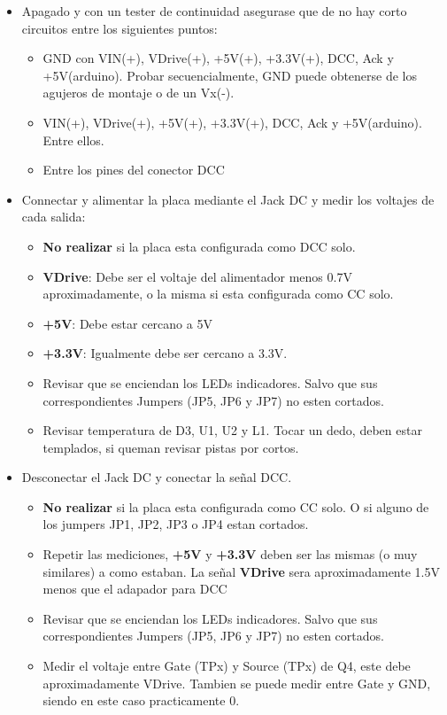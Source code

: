 \begin{itemize}
	\item Apagado y con un tester de continuidad asegurase que de no hay corto circuitos entre los siguientes puntos:

\begin{itemize}
\item GND con VIN(+), VDrive(+), +5V(+), +3.3V(+), DCC, Ack y +5V(arduino). Probar secuencialmente, GND puede obtenerse de los agujeros de montaje o de un Vx(-).
\item  VIN(+), VDrive(+), +5V(+), +3.3V(+), DCC, Ack y +5V(arduino). Entre ellos.
\item Entre los pines del conector DCC
\end{itemize}

\item Connectar y alimentar la placa mediante el Jack DC y medir los voltajes de cada salida:
	\begin{itemize}
	\item \textbf{No realizar} si la placa esta configurada como DCC solo. 
	\item \textbf{VDrive}: Debe ser el voltaje del alimentador menos 0.7V aproximadamente, o la misma si esta configurada como CC solo.
	\item \textbf{+5V}: Debe estar cercano a 5V
	\item \textbf{+3.3V}: Igualmente debe ser cercano a 3.3V.
	\item Revisar que se enciendan los LEDs indicadores. Salvo que sus correspondientes Jumpers (JP5, JP6 y JP7) no esten cortados.
	\item Revisar temperatura de D3, U1, U2 y L1. Tocar un dedo, deben estar templados, si queman revisar pistas por cortos.
	\end{itemize}
\item Desconectar el Jack DC y conectar la señal DCC.
	\begin{itemize}

	\item \textbf{No realizar} si la placa esta configurada como CC solo. O si alguno de los  jumpers JP1, JP2, JP3 o JP4 estan cortados.

	\item Repetir las mediciones, \textbf{+5V} y \textbf{+3.3V} deben ser las mismas (o muy similares) a como estaban. La señal \textbf{VDrive} sera aproximadamente 1.5V menos que el adapador para DCC
	\item Revisar que se enciendan los LEDs indicadores. Salvo que sus correspondientes Jumpers (JP5, JP6 y JP7) no esten cortados.
\item Medir el voltaje entre Gate (TPx) y Source (TPx) de Q4, este debe aproximadamente VDrive. Tambien se puede medir entre Gate y GND, siendo en este caso practicamente 0.


\end{itemize}
\end{itemize}
